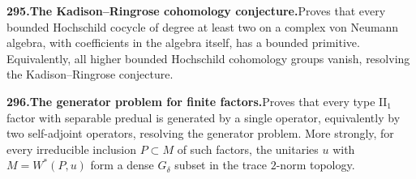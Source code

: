 \documentclass[11pt,a4paper]{article}
\begin{document}
  \par \begin{minipage}{\linewidth}
  \fontsize{10.5}{12.6}\selectfont\RaggedRight
  \hypertarget{result 295}{}
  {\bfseries\textcolor{muted}{295.}\enspace The Kadison--Ringrose cohomology conjecture.}\enspace Proves that every bounded Hochschild cocycle of degree at least two on a complex von Neumann algebra, with coefficients in the algebra itself, has a bounded primitive. Equivalently, all higher bounded Hochschild cohomology groups vanish, resolving the Kadison--Ringrose conjecture.\par
  \end{minipage}\par\vspace{5pt}



  \par \begin{minipage}{\linewidth}
  \fontsize{10.5}{12.6}\selectfont\RaggedRight
  \hypertarget{result 296}{}
  {\bfseries\textcolor{muted}{296.}\enspace The generator problem for finite factors.}\enspace Proves that every type $\mathrm{II}_1$ factor with separable predual is generated by a single operator, equivalently by two self-adjoint operators, resolving the generator problem. More strongly, for every irreducible inclusion $P\subset M$ of such factors, the unitaries $u$ with $M=W^*(P,u)$ form a dense $G_\delta$ subset in the trace $2$-norm topology.\par
  \end{minipage}\par\vspace{5pt}
\end{document}
